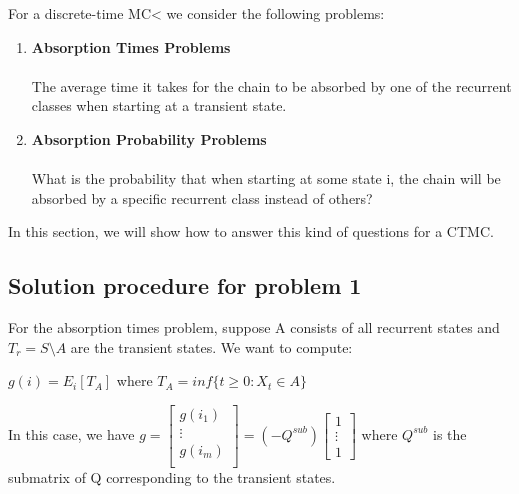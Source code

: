 \documentclass[12pt]{article}
\begin{document}
For a discrete-time MC< we consider the following problems:
\begin{enumerate}
    \item \textbf{Absorption Times Problems}\\
    \\ The average time it takes for the chain to be absorbed by one of the recurrent classes when starting at a transient state.
    \item \textbf{Absorption Probability Problems}\\
    \\ What is the probability that when starting at some state i, the chain will be absorbed by a specific recurrent class instead of others?
\end{enumerate}
In this section, we will show how to answer this kind of questions for a CTMC.

\subsection{Solution procedure for problem 1}

For the absorption times problem, suppose A consists of all recurrent states and $T_r = S \setminus A$ are the transient states. We want to compute:
\begin{center}
    $g(i) = E_i[T_A]$ where $T_A = inf\{t\geq0: X_t \in A\}$
\end{center}
In this case, we have $g = \begin{bmatrix}
 g(i_1) \\
\vdots \\
g(i_m) \\
\end{bmatrix} = (-Q^{sub})\begin{bmatrix}
 1\\
 \vdots\\
1
\end{bmatrix}$
where $Q^{sub}$ is the submatrix of Q corresponding to the transient states.
\end{document}
